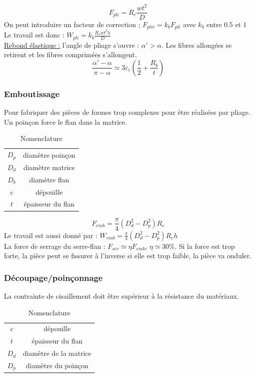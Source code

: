\documentclass[../main.tex]{subfiles}
\begin{document}
\begin{equation}
    F_{pli} = R_e \frac{w t^2}{D}
\end{equation}
On peut introduire un facteur de correction ; $F_{plir} = k_b F_{pli}$ avec $k_b$ entre 0.5 et 1\\

Le travail est donc : $W_{pli} = k_b \frac{R_e wt^2 h}{D}$\\
\quad \underline{Rebond élastique :} l'angle de pliage s'ouvre : $\alpha'>\alpha$. Les fibres allongées se retirent et les fibres comprimées s'allongent.\begin{equation}
    \frac{\alpha'-\alpha}{\pi-\alpha} \simeq 3 \varepsilon_e (\frac{1}{2} + \frac{R_b}{t})
\end{equation}

\subsubsection{Emboutissage}
Pour fabriquer des pièces de formes trop complexes pour être réalisées par pliage. Un poinçon force le flan dans la matrice. \\
\begin{table}[hbt!]
    \centering
    \begin{tabular}{c|c}
        $D_p$ & diamètre poinçon  \\
        $D_d$ & diamètre matrice\\
        $D_b$ & diamètre flan\\
        $c$ & dépouille\\
        $t$ & épaisseur du flan\\
    \end{tabular}
    \caption{Nomenclature}
\end{table}

\begin{equation}
    F_{emb} = \frac{\pi}{4}(D_d^2-D_p^2) R_e
\end{equation}
Le travail est aussi donné par : $W_{emb} = \frac{\pi}{4}(D_d^2-D_p^2)R_eh$\\
La force de serrage du serre-flan : $F_{ser} \simeq \eta F_{emb}$, $\eta \simeq 30\%$. Si la force est trop forte, la pièce peut se fissurer à l'inverse si elle est trop faible, la pièce va onduler.\\

\subsubsection{Découpage/poinçonnage}
La contrainte de cisaillement doit être supérieur à la résistance du matériaux.\\
\begin{table}[hbt!]
    \centering
    \begin{tabular}{c|c}
        $c$ & dépouille \\
        $t$ & épaisseur du flan\\
        $D_d$ & diamètre de la matrice\\
        $D_p$ & diamètre du poinçon\\
    \end{tabular}
    \caption{Nomenclature}
\end{table}
\end{document}
